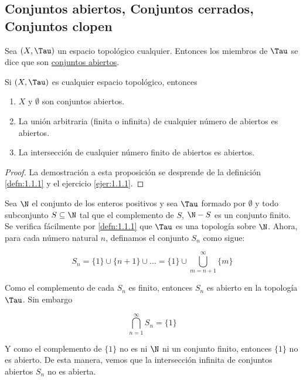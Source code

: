 \subsection{Conjuntos abiertos, Conjuntos cerrados, Conjuntos clopen}

\begin{defn}
    Sea $(X, \Tau)$ un espacio topológico cualquier. Entonces los miembros de $\Tau$ se dice que son \ul{conjuntos abiertos}.
\end{defn}

\begin{pro}
    Si $(X, \Tau)$ es cualquier espacio topológico, entonces
    
    \begin{enumerate}
        \item $X$ y $\emptyset$ son conjuntos abiertos.
        \item La unión arbitraria (finita o infinita) de cualquier número de abiertos es abiertos.
        \item La intersección de cualquier número finito de abiertos es abiertos.
    \end{enumerate}
\end{pro}

\begin{proof}
    La demostración a esta proposición se desprende de la definición \ref{defn:1.1.1} y el ejercicio \ref{ejer:1.1.1}.
\end{proof}

\begin{ejem}
    Sea $\N$ el conjunto de los enteros positivos y sea $\Tau$ formado por $\emptyset$ y todo subconjunto $S \subseteq \N$ tal que el complemento de $S$, $\N - S$ es un conjunto finito. Se verifica fácilmente por \ref{defn:1.1.1} que $\Tau$ es una topología sobre $\N$. Ahora, para cada número natural $n$, definamos el conjunto $S_n$ como sigue:
    
    \[
    S_n = \{1\} \cup \{n+1\} \cup \dots = \{1\} \cup \bigcup_{m = n+1}^{\infty} \{m\}
    \]
    
    Como el complemento de cada $S_n$ es finito, entonces $S_n$ es abierto en la topología $\Tau$. Sin embargo
    
    \[
    \bigcap_{n = 1}^{\infty} S_n = \{1\}
    \]
    
    Y como el complemento de $\{1\}$ no es ni $\N$ ni un conjunto finito, entonces $\{1\}$ no es abierto. De esta manera, vemos que la intersección infinita de conjuntos abiertos $S_n$ no es abierta.
\end{ejem}

